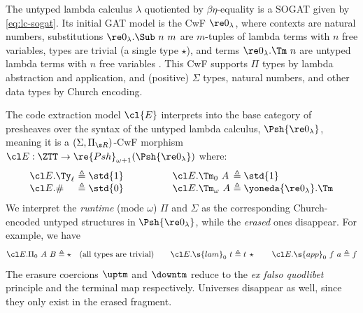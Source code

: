\documentclass[a4paper,UKenglish,cleveref,autoref,thm-restate]{lipics-v2021}
\begin{document}
\begin{definition}\label{def:code-extr}
The untyped lambda calculus $\lambda$ quotiented by $\beta\eta$-equality is a SOGAT given by
\cref{eq:lc-sogat}. Its initial GAT model is the CwF $\re 0_\lambda$, where contexts
are natural numbers, substitutions $\re 0_\lambda.\Sub\ n\ m$ are $m$-tuples of lambda
terms with $n$ free variables, types are trivial (a single type $\star$), and terms
$\re 0_\lambda.\Tm\ n$ are untyped lambda terms with $n$ free variables \cite{Castellan2019-sh}.
This CwF supports $\Pi$ types by lambda abstraction and
application, and (positive) $\Sigma$ types, natural numbers, and other data types by
Church encoding.
\end{definition}

\begin{definition}
  The code extraction model $\cl{E}$ interprets \ZTT into the
  base category of presheaves over the syntax of the untyped lambda calculus,
  $\Psh{\re 0_\lambda}$, meaning it is a $(\Sigma,\Pi_{\s R})$-CwF morphism
  $\cl E : \ZTT \to \re{Psh}_{\omega + 1}(\Psh{\re 0_\lambda})$ where:
  \[
    \begin{array}{c@{\qquad\qquad}c}
      \begin{array}{l@{\ }l}
        \cl E.\Ty_\ell &\triangleq \std{1} \\
        \cl E.\# &\triangleq \std{0}
      \end{array}
      &
      \begin{array}{l@{\ }l}
        \cl E.\Tm_0\ A &\triangleq \std{1} \\
        \cl E.\Tm_\omega\ A &\triangleq \yoneda {\re 0_\lambda}.\Tm
      \end{array}
    \end{array}
  \]
We interpret the \emph{runtime} (mode $\omega$) $\Pi$ and $\Sigma$
as the corresponding Church-encoded untyped structures in $\Psh {\re 0_\lambda}$, while the \emph{erased}
ones disappear. For example, we have
\[
\cl E.\Pi_0\ A\ B \triangleq \star \quad \text{(all types are trivial)} \qquad
\cl E.\s{lam}_0\ t \triangleq t \, \star \qquad \cl E.\s{app}_0\ f\ a \triangleq f
\]
The erasure coercions $\uptm$ and $\downtm$ reduce to the \emph{ex falso quodlibet} principle and
the terminal map respectively.
Universes disappear as well, since they only exist in the erased fragment.
\end{definition}
\end{document}

